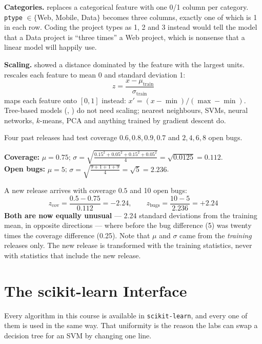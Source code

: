 \textbf{Categories.}  replaces a categorical feature with
one 0/1 column per category. \texttt{ptype} $\in \{$Web, Mobile, Data$\}$
becomes three columns, exactly one of which is 1 in each row. Coding the
project types as 1, 2 and 3 instead would tell the model that a Data project is
``three times'' a Web project, which is nonsense that a linear model will happily
use.

\textbf{Scaling.}  showed a distance dominated by the feature with the
largest units.  rescales each feature to mean 0 and
standard deviation 1:
\[
z = \frac{x - \mu_{\text{train}}}{\sigma_{\text{train}}}
\]
 maps each feature onto $[0, 1]$ instead:
$x' = (x - \min)/(\max - \min)$. Tree-based models (,
) do not need scaling; nearest neighbours, SVMs, neural networks,
$k$-means, PCA and anything trained by gradient descent do.

\begin{worked}
Four past releases had test coverage $0.6, 0.8, 0.9, 0.7$ and $2, 4, 6, 8$
open bugs.

\smallskip
\textbf{Coverage:} $\mu = 0.75$;
$\sigma = \sqrt{\tfrac{0.15^2 + 0.05^2 + 0.15^2 + 0.05^2}{4}}
= \sqrt{0.0125} = 0.112$.\\
\textbf{Open bugs:} $\mu = 5$;
$\sigma = \sqrt{\tfrac{9 + 1 + 1 + 9}{4}} = \sqrt{5} = 2.236$.

\smallskip
A new release arrives with coverage $0.5$ and 10 open bugs:
\[
z_{\text{cov}} = \frac{0.5 - 0.75}{0.112} = -2.24, \qquad
z_{\text{bugs}} = \frac{10 - 5}{2.236} = +2.24
\]
\textbf{Both are now equally unusual} --- 2.24 standard deviations from the
training mean, in opposite directions --- where before the bug difference (5)
was twenty times the coverage difference (0.25). Note that $\mu$ and $\sigma$
came from the \emph{training} releases only. The new release is transformed with
the training statistics, never with statistics that include the new release.
\end{worked}

\section{The scikit-learn Interface}

Every algorithm in this course is available in \texttt{scikit-learn}, and every
one of them is used in the same way. That uniformity is the reason the labs can
swap a decision tree for an SVM by changing one line.


